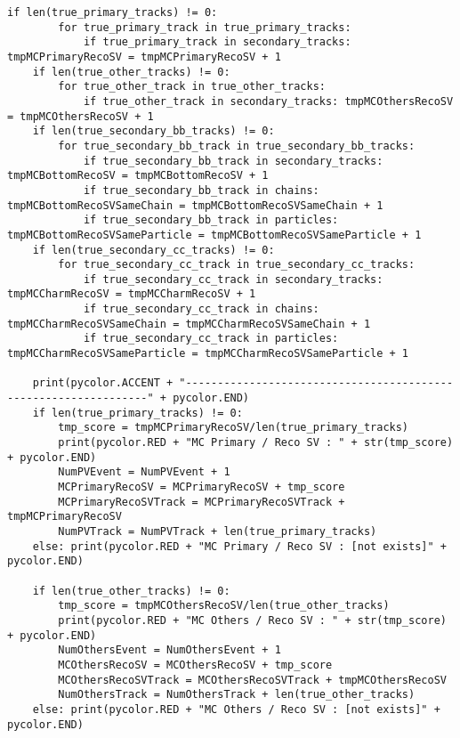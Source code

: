\begin{lstlisting}[caption=崩壊点検出アルゴリズム用関数,label=VertexFinder1]
    if len(true_primary_tracks) != 0:
        for true_primary_track in true_primary_tracks:
            if true_primary_track in secondary_tracks: tmpMCPrimaryRecoSV = tmpMCPrimaryRecoSV + 1
    if len(true_other_tracks) != 0:
        for true_other_track in true_other_tracks:
            if true_other_track in secondary_tracks: tmpMCOthersRecoSV = tmpMCOthersRecoSV + 1
    if len(true_secondary_bb_tracks) != 0:
        for true_secondary_bb_track in true_secondary_bb_tracks:
            if true_secondary_bb_track in secondary_tracks: tmpMCBottomRecoSV = tmpMCBottomRecoSV + 1
            if true_secondary_bb_track in chains: tmpMCBottomRecoSVSameChain = tmpMCBottomRecoSVSameChain + 1
            if true_secondary_bb_track in particles: tmpMCBottomRecoSVSameParticle = tmpMCBottomRecoSVSameParticle + 1
    if len(true_secondary_cc_tracks) != 0:
        for true_secondary_cc_track in true_secondary_cc_tracks:
            if true_secondary_cc_track in secondary_tracks: tmpMCCharmRecoSV = tmpMCCharmRecoSV + 1
            if true_secondary_cc_track in chains: tmpMCCharmRecoSVSameChain = tmpMCCharmRecoSVSameChain + 1
            if true_secondary_cc_track in particles: tmpMCCharmRecoSVSameParticle = tmpMCCharmRecoSVSameParticle + 1

    print(pycolor.ACCENT + "----------------------------------------------------------------" + pycolor.END)
    if len(true_primary_tracks) != 0:
        tmp_score = tmpMCPrimaryRecoSV/len(true_primary_tracks)
        print(pycolor.RED + "MC Primary / Reco SV : " + str(tmp_score) + pycolor.END)
        NumPVEvent = NumPVEvent + 1
        MCPrimaryRecoSV = MCPrimaryRecoSV + tmp_score
        MCPrimaryRecoSVTrack = MCPrimaryRecoSVTrack + tmpMCPrimaryRecoSV
        NumPVTrack = NumPVTrack + len(true_primary_tracks)
    else: print(pycolor.RED + "MC Primary / Reco SV : [not exists]" + pycolor.END)

    if len(true_other_tracks) != 0:
        tmp_score = tmpMCOthersRecoSV/len(true_other_tracks)
        print(pycolor.RED + "MC Others / Reco SV : " + str(tmp_score) + pycolor.END)
        NumOthersEvent = NumOthersEvent + 1
        MCOthersRecoSV = MCOthersRecoSV + tmp_score
        MCOthersRecoSVTrack = MCOthersRecoSVTrack + tmpMCOthersRecoSV
        NumOthersTrack = NumOthersTrack + len(true_other_tracks)
    else: print(pycolor.RED + "MC Others / Reco SV : [not exists]" + pycolor.END)


\end{lstlisting}
